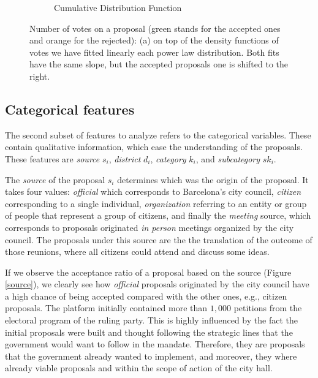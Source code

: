 \begin{figure}[H]
\begin{subfigure}{0.5\textwidth}
        \caption{Cumulative Distribution Function}
    \end{subfigure}
    \caption{Number of votes on a proposal (green stands for the accepted ones and orange for the rejected): (a) on top of the density functions of votes we have fitted linearly each power law distribution. Both fits have the same slope, but the accepted proposals one is shifted to the right.}
    \label{votes}
\end{figure}

\subsection{Categorical features}\label{sec:catfeat}
The second subset of features to analyze refers to the categorical variables. These contain qualitative information, which ease the understanding of the proposals. These features are \emph{source} $s_i$, \emph{district} $d_i$, \emph{category} $k_i$, and \emph{subcategory} $sk_i$. 

The \emph{source} of the proposal $s_i$ determines which was the origin of the proposal. It takes four values: \emph{official} which corresponds to Barcelona's city council, \emph{citizen} corresponding to a single individual, \emph{organization} referring to an entity or group of people that represent a group of citizens, and finally the \emph{meeting} source, which corresponds to proposals originated \emph{in person} meetings organized by the city council. The proposals under this source are the the translation of the outcome of those reunions, where all citizens could attend and discuss some ideas.

If we observe the acceptance ratio  of a proposal based on the source (Figure \ref{source}), we clearly see how \emph{official} proposals originated by the city council have a high chance of being accepted compared with the other ones, e.g., citizen proposals. The platform initially contained more than $1,000$ petitions from the electoral program of the ruling party. This is highly influenced by the fact the initial proposals were built and thought following the strategic lines that the government would want to follow in the mandate. Therefore, they are proposals that the government already wanted to implement, and moreover, they where already viable proposals and within the scope of action of the city hall.

